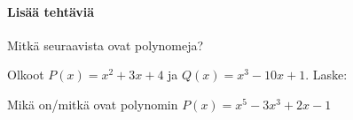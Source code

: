 \begin{tehtavasivu}
\begin{tehtava}
	\begin{vastaus}
		\begin{alakohdat}
	\end{alakohdat}
	\end{vastaus}
\end{tehtava}

\paragraph*{Lisää tehtäviä}

\begin{tehtava}
    Mitkä seuraavista ovat polynomeja?
    \begin{alakohdat}
    \end{alakohdat}
    \begin{vastaus}
        \begin{alakohdat}
        \end{alakohdat}
    \end{vastaus}
\end{tehtava}

\begin{tehtava}
    Olkoot $P(x)=x^2+3x+4$ ja $Q(x)=x^3-10x+1$. Laske:
    \begin{alakohdat}
    \end{alakohdat}
    \begin{vastaus}
        \begin{alakohdat}
        \end{alakohdat}
    \end{vastaus}
\end{tehtava}

\begin{tehtava}
	Mikä on/mitkä ovat polynomin $P(x) = x^5-3x^3+2x-1$
	\begin{alakohdat}
	\end{alakohdat}


\end{tehtava}
\end{tehtavasivu}
